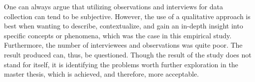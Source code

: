 One can always argue that utilizing observations and interviews for data collection can tend to be subjective. However, the use of a qualitative approach is best when wanting to describe, contextualize, and gain an in-depth insight into specific concepts or phenomena, which was the case in this empirical study. Furthermore, the number of interviewees and observations was quite poor. The result produced can, thus, be questioned. Though the result of the study does not stand for itself, it is identifying the problems worth further exploration in the master thesis, which is achieved, and therefore, more acceptable.

\cleardoublepage